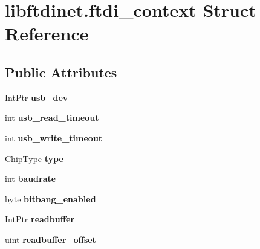 \hypertarget{structlibftdinet_1_1ftdi__context}{}\section{libftdinet.\+ftdi\+\_\+context Struct Reference}
\label{structlibftdinet_1_1ftdi__context}
\subsection*{Public Attributes}
\begin{DoxyCompactItemize}
\item 
\mbox{\label{structlibftdinet_1_1ftdi__context_a780509d6410cae953bfa6eccda686dfb}} 
Int\+Ptr {\bfseries usb\+\_\+dev}
\item 
\mbox{\label{structlibftdinet_1_1ftdi__context_ad2077b7e402357c7edda07d558ff1b73}} 
int {\bfseries usb\+\_\+read\+\_\+timeout}
\item 
\mbox{\label{structlibftdinet_1_1ftdi__context_afa81fc41222db99fce0588cb80052d22}} 
int {\bfseries usb\+\_\+write\+\_\+timeout}
\item 
\mbox{\label{structlibftdinet_1_1ftdi__context_ae55a199dffed36db3217b5527a210b0f}} 
Chip\+Type {\bfseries type}
\item 
\mbox{\label{structlibftdinet_1_1ftdi__context_a6dc0083887bfedd35bb06d01b3010e5a}} 
int {\bfseries baudrate}
\item 
\mbox{\label{structlibftdinet_1_1ftdi__context_a7ebe683bdfba39939be3622ff87062ca}} 
byte {\bfseries bitbang\+\_\+enabled}
\item 
\mbox{\label{structlibftdinet_1_1ftdi__context_a5947bfe5b1988fa5345f6d5f987d3a0e}} 
Int\+Ptr {\bfseries readbuffer}
\item 
\mbox{\label{structlibftdinet_1_1ftdi__context_a4006cc3c715237306830c91ed1354b76}} 
uint {\bfseries readbuffer\+\_\+offset}

\end{DoxyCompactItemize}
